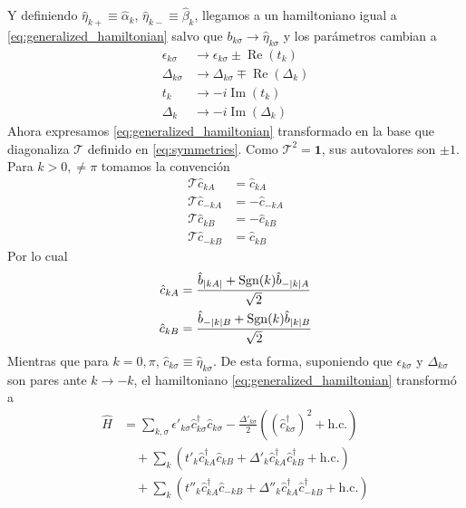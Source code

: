 Y definiendo $\hat \eta_{k+} \equiv \hat \alpha_k$, $\hat \eta_{k-} \equiv \hat \beta_k$,  llegamos a un hamiltoniano igual a \eqref{eq:generalized_hamiltonian} salvo que $b_{k\sigma} \rightarrow \hat \eta_{k\sigma}$ y los parámetros cambian a
\begin{subequations}
  \begin{align}
    \epsilon_{k\sigma} &\rightarrow \epsilon_{k\sigma} \pm \operatorname{Re}\left(t_k\right)\\
    \Delta_{k\sigma} &\rightarrow \Delta_{k\sigma} \mp \operatorname{Re}\left(\Delta_{k}\right)\\
    t_k &\rightarrow -i\operatorname{Im}\left(t_k\right)\\
    \Delta_k &\rightarrow -i\operatorname{Im}\left(\Delta_k\right)
  \end{align}
\end{subequations}
Ahora expresamos \eqref{eq:generalized_hamiltonian} transformado en la base que diagonaliza $\mathcal{T}$ definido en \eqref{eq:symmetries}. Como $\mathcal T^2 = \mathbf{1}$, sus autovalores son $\pm 1$. Para $k>0, \neq \pi$ tomamos la convención 
\begin{subequations}
  \begin{align}
    \mathcal{T} \hat c_{kA} &= \hat c_{kA}\\
    \mathcal{T} \hat c_{-kA} &= -\hat c_{-kA}\\
    \mathcal{T} \hat c_{kB} &= -\hat c_{kB}\\
    \mathcal{T} \hat c_{-kB} &= \hat c_{kB}
  \end{align}
\end{subequations}
Por lo cual 
\begin{subequations}
  \begin{align}
    \hat c_{kA} &= \frac{\hat b_{\abs{kA}} + \operatorname{Sgn}(k) \hat b_{-\abs{k}A}}{\sqrt{2}}\\
    \hat c_{kB} &= \frac{\hat b_{-\abs{k}B} + \operatorname{Sgn}(k) \hat b_{\abs{k}B}}{\sqrt{2}}
  \end{align}
\end{subequations}
Mientras que para $k = 0, \pi$, $\hat c_{k\sigma} \equiv \hat \eta_{k\sigma}$. De esta forma, suponiendo que $\epsilon_{k\sigma}$ y $\Delta_{k\sigma}$ son pares ante $k \rightarrow -k$, el hamiltoniano \eqref{eq:generalized_hamiltonian} transformó a 
\begin{align}
  \hat H &= \sum_{k,\sigma}
                \epsilon'_{k\sigma} \hat c^\dag_{k\sigma}\hat c_{k\sigma} 
                - \frac{\Delta'_{k\sigma}}{2}\left((\hat c^\dag_{k\sigma})^2 + \text{h.c.}\right) \nonumber\\
               &\quad +\sum_{k}\left(t'_k\hat c^\dag_{kA} \hat c_{kB} +\Delta'_k\hat c^\dag_{kA}\hat c_{kB}^\dag+ \text{h.c.}\right)\nonumber\\
               &\quad +\sum_{k}\left(t''_k\hat c^\dag_{kA} \hat c_{-kB} +\Delta''_k\hat c^\dag_{kA}\hat c_{-kB}^\dag+ \text{h.c.}\right)\label{eq:time_reversal_transform}
\end{align}
